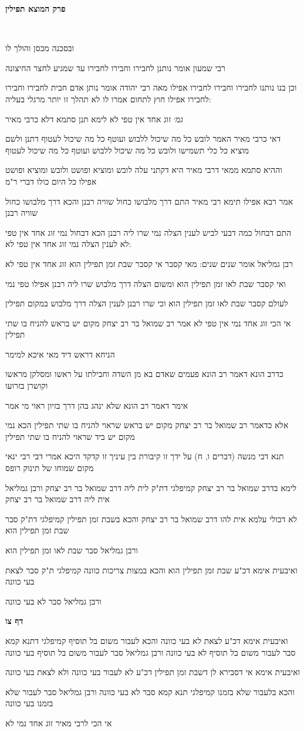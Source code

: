 \documentclass[12pt, openany]{book}
\newcommand{\sethebfont}{
\fontsize{10.5pt}{21.0pt} \selectfont
}
\newcommand{\textblock}[1]{
{\sethebfont #1\\}	
}
\newcommand{\chapname}{}
\newcommand{\sectname}{}
\newcommand{\newchap}[1]{
	\addcontentsline{toc}{chapter}{#1}
	\renewcommand{\chapname}{#1}
		\begin{center}
			\textbf{%
\fontsize{16pt}{16pt}\selectfont
				#1}
		\end{center}
}
\newcommand{\newsection}[1]{
	\addcontentsline{toc}{section}{#1}
	\renewcommand{\sectname}{#1}	
	\vspace{-\baselineskip}
	\begin{center}
		\textbf{%
\fontsize{16pt}{16pt}\selectfont
			#1}
	\end{center}
	\vspace{-\baselineskip}
	\nopagebreak
}
\begin{document}
\newchap{פרק \quad המוצא תפילין}
\textblock{}
\textblock{ובסכנה מכסן והולך לו}
\textblock{רבי שמעון אומר נותנן לחבירו וחבירו לחבירו עד שמגיע לחצר החיצונה}
\textblock{וכן בנו נותנו לחבירו וחבירו לחבירו אפילו מאה רבי יהודה אומר נותן אדם חבית לחבירו וחבירו לחבירו אפילו חוץ לתחום אמרו לו לא תהלך זו יותר מרגלי בעליה:}
\textblock{{\large\emph{גמ׳}} זוג אחד אין טפי לא לימא תנן סתמא דלא כרבי מאיר}
\textblock{דאי כרבי מאיר האמר לובש כל מה שיכול ללבוש ועוטף כל מה שיכול לעטוף דתנן ולשם מוציא כל כלי תשמישו ולובש כל מה שיכול ללבוש ועוטף כל מה שיכול לעטוף}
\textblock{וההיא סתמא ממאי דרבי מאיר היא דקתני עלה לובש ומוציא ופושט ולובש ומוציא ופושט אפילו כל היום כולו דברי ר"מ}
\textblock{אמר רבא אפילו תימא רבי מאיר התם דרך מלבושו כחול שוויה רבנן והכא דרך מלבושו כחול שוויה רבנן}
\textblock{התם דבחול כמה דבעי לביש לענין הצלה נמי שרו ליה רבנן הכא דבחול נמי זוג אחד אין טפי לא לענין הצלה נמי זוג אחד אין טפי לא:}
\textblock{רבן גמליאל אומר שנים שנים: מאי קסבר אי קסבר שבת זמן תפילין הוא זוג אחד אין טפי לא}
\textblock{ואי קסבר שבת לאו זמן תפילין הוא ומשום הצלה דרך מלבוש שרו ליה רבנן אפילו טפי נמי}
\textblock{לעולם קסבר שבת לאו זמן תפילין הוא וכי שרו רבנן לענין הצלה דרך מלבוש במקום תפילין}
\textblock{אי הכי זוג אחד נמי אין טפי לא אמר רב שמואל בר רב יצחק מקום יש בראש להניח בו שתי תפילין}
\textblock{הניחא דראש דיד מאי איכא למימר}
\textblock{כדרב הונא דאמר רב הונא פעמים שאדם בא מן השדה וחבילתו על ראשו ומסלקן מראשו וקושרן בזרועו}
\textblock{אימר דאמר רב הונא שלא ינהג בהן דרך בזיון ראוי מי אמר}
\textblock{אלא כדאמר רב שמואל בר רב יצחק מקום יש בראש שראוי להניח בו שתי תפילין הכא נמי מקום יש ביד שראוי להניח בו שתי תפילין}
\textblock{תנא דבי מנשה (דברים ו, ח) על ידך זו קיבורת בין עיניך זו קדקד היכא אמרי דבי רבי ינאי מקום שמוחו של תינוק רופס}
\textblock{לימא בדרב שמואל בר רב יצחק קמיפלגי דת"ק לית ליה דרב שמואל בר רב יצחק ורבן גמליאל אית ליה דרב שמואל בר רב יצחק}
\textblock{לא דכולי עלמא אית להו דרב שמואל בר רב יצחק והכא בשבת זמן תפילין קמיפלגי דת"ק סבר שבת זמן תפילין הוא}
\textblock{ורבן גמליאל סבר שבת לאו זמן תפילין הוא}
\textblock{ואיבעית אימא דכ"ע שבת זמן תפילין הוא והכא במצות צריכות כוונה קמיפלגי ת"ק סבר לצאת בעי כוונה}
\textblock{ורבן גמליאל סבר לא בעי כוונה}
\newsection{דף צו}
\textblock{ואיבעית אימא דכ"ע לצאת לא בעי כוונה והכא לעבור משום בל תוסיף קמיפלגי דתנא קמא סבר לעבור משום בל תוסיף לא בעי כוונה ורבן גמליאל סבר לעבור משום בל תוסיף בעי כוונה}
\textblock{ואיבעית אימא אי דסבירא לן דשבת זמן תפילין דכ"ע לא לעבור בעי כוונה ולא לצאת בעי כוונה}
\textblock{והכא בלעבור שלא בזמנו קמיפלגי תנא קמא סבר לא בעי כוונה ורבן גמליאל סבר לעבור שלא בזמנו בעי כוונה}
\textblock{אי הכי לרבי מאיר זוג אחד נמי לא}
\end{document}
